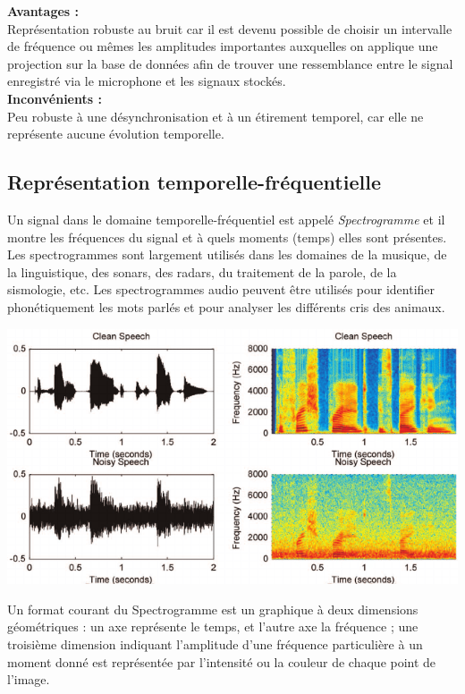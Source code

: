\documentclass[11pt, report, french]{scrreprt}
\begin{document}
\textbf{Avantages :}\\

Représentation robuste au bruit car il est devenu possible de choisir un intervalle de fréquence ou mêmes les amplitudes importantes auxquelles on applique une projection sur la base de données afin de trouver une ressemblance entre le signal enregistré via le microphone et les signaux stockés.
\\

\textbf{Inconvénients :}\\

Peu robuste à une désynchronisation et à un étirement temporel, car elle ne représente aucune évolution temporelle.

\subsection{Représentation temporelle-fréquentielle}
Un signal dans le domaine temporelle-fréquentiel est appelé \textit{Spectrogramme} et il montre les fréquences du signal et à quels moments (temps) elles sont présentes.\\
Les spectrogrammes sont largement utilisés dans les domaines de la musique, de la linguistique, des sonars, des radars, du traitement de la parole, de la sismologie, etc. Les spectrogrammes audio peuvent être utilisés pour identifier phonétiquement les mots parlés et pour analyser les différents cris des animaux.\\

\begin{center}
	\includegraphics[scale=0.45]{img/spectrogram.png}
\end{center}

Un format courant du Spectrogramme est un graphique à deux dimensions géométriques : un axe représente le temps, et l'autre axe la fréquence ; une troisième dimension indiquant l'amplitude d'une fréquence particulière à un moment donné est représentée par l'intensité ou la couleur de chaque point de l'image.\\\par
\end{document}

